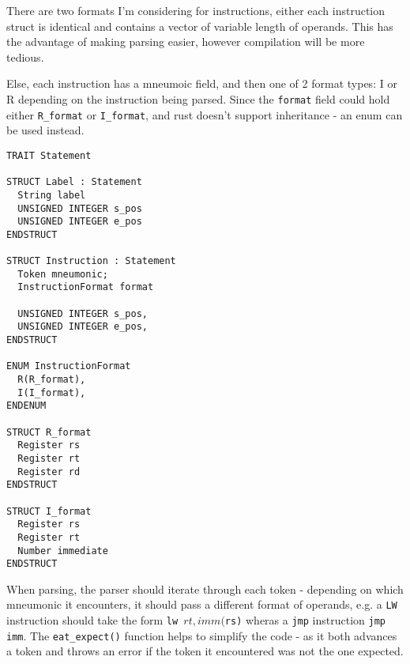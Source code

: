 There are two formats I'm considering for instructions, either each instruction struct is identical and contains a vector of variable length of operands. This has the advantage of making parsing easier, however compilation will be more tedious.

Else, each instruction has a mneumoic field, and then one of 2 format types: I or R depending on the instruction being parsed. Since the \texttt{format} field could hold either \texttt{R\_format} or \texttt{I\_format}, and rust doesn't support inheritance - an enum can be used instead. 

\begin{lstlisting}
TRAIT Statement

STRUCT Label : Statement 
  String label 
  UNSIGNED INTEGER s_pos 
  UNSIGNED INTEGER e_pos 
ENDSTRUCT

STRUCT Instruction : Statement
  Token mneumonic;
  InstructionFormat format

  UNSIGNED INTEGER s_pos, 
  UNSIGNED INTEGER e_pos,
ENDSTRUCT

ENUM InstructionFormat
  R(R_format),
  I(I_format),
ENDENUM
  
STRUCT R_format 
  Register rs
  Register rt
  Register rd
ENDSTRUCT

STRUCT I_format 
  Register rs
  Register rt
  Number immediate
ENDSTRUCT
\end{lstlisting}

When parsing, the parser should iterate through each token - depending on which mneumonic it encounters, it should pass a different format of operands, e.g. a \texttt{LW} instruction should take the form \texttt{lw $rt, imm($rs)} wheras a \texttt{jmp} instruction \texttt{jmp imm}. The \texttt{eat\_expect()} function helps to simplify the code - as it both advances a token and throws an error if the token it encountered was not the one expected.

